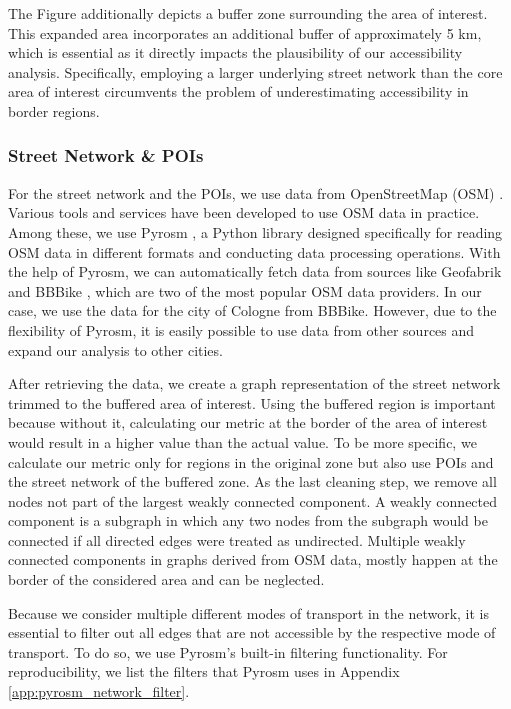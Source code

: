 The Figure additionally depicts a buffer zone surrounding the area of interest.
This expanded area incorporates an additional buffer of approximately 5 km, which is essential as it directly impacts the plausibility of our accessibility analysis.
Specifically, employing a larger underlying street network than the core area of interest circumvents the problem of underestimating accessibility in border regions.

\subsubsection{Street Network \& POIs}
\label{subs:street_network_pois}

For the street network and the POIs, we use data from OpenStreetMap (OSM) .
Various tools and services have been developed to use OSM data in practice.
Among these, we use Pyrosm , a Python library designed specifically for reading OSM data in different formats and conducting data processing operations.
With the help of Pyrosm, we can automatically fetch data from sources like Geofabrik  and BBBike \cite{schneiderBBBikeExtractsOpenStreetMap2023}, which are two of the most popular OSM data providers.
In our case, we use the data for the city of Cologne from BBBike.
However, due to the flexibility of Pyrosm, it is easily possible to use data from other sources and expand our analysis to other cities.

After retrieving the data, we create a graph representation of the street network trimmed to the buffered area of interest.
Using the buffered region is important because without it, calculating our metric at the border of the area of interest would result in a higher value than the actual value.
To be more specific, we calculate our metric only for regions in the original zone but also use POIs and the street network of the buffered zone.
As the last cleaning step, we remove all nodes not part of the largest weakly connected component.
A weakly connected component is a subgraph in which any two nodes from the subgraph would be connected if all directed edges were treated as undirected.
Multiple weakly connected components in graphs derived from OSM data, mostly happen at the border of the considered area and can be neglected.

Because we consider multiple different modes of transport in the network, it is essential to filter out all edges that are not accessible by the respective mode of transport.
To do so, we use Pyrosm's built-in filtering functionality.
For reproducibility, we list the filters that Pyrosm uses in Appendix \ref{app:pyrosm_network_filter}.


